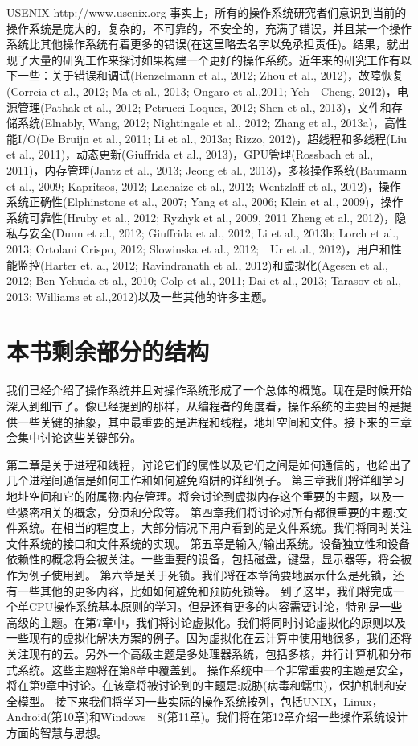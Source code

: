 	USENIX http://www.usenix.org
	事实上，所有的操作系统研究者们意识到当前的操作系统是庞大的，复杂的，不可靠的，不安全的，充满了错误，并且某一个操作系统比其他操作系统有着更多的错误(在这里略去名字以免承担责任)。结果，就出现了大量的研究工作来探讨如果构建一个更好的操作系统。近年来的研究工作有以下一些：关于错误和调试(Renzelmann et al., 2012; Zhou et
al., 2012)，故障恢复(Correia et al., 2012; Ma et al., 2013; Ongaro et al.,2011; Yeh　Cheng, 2012)，电源管理(Pathak et al., 2012; Petrucci Loques, 2012; Shen et al., 2013)，文件和存储系统(Elnably, Wang, 2012; Nightingale et al., 2012; Zhang et al., 2013a)，高性能I/O(De Bruijn et al., 2011; Li et al., 2013a; Rizzo, 2012)，超线程和多线程(Liu et al., 2011)，动态更新(Giuffrida et al., 2013)，GPU管理(Rossbach et al., 2011)，内存管理(Jantz et al., 2013;
Jeong et al., 2013)，多核操作系统(Baumann et al., 2009; Kapritsos, 2012; Lachaize et al., 2012; Wentzlaff et al., 2012)，操作系统正确性(Elphinstone et al., 2007; Yang et al., 2006; Klein et al., 2009)，操作系统可靠性(Hruby et al., 2012; Ryzhyk et al., 2009, 2011 Zheng et al., 2012)，隐私与安全(Dunn et al., 2012; Giuffrida et al., 2012; Li et al.,
2013b; Lorch et al., 2013; Ortolani Crispo, 2012; Slowinska et al., 2012;　Ur et al., 2012)，用户和性能监控(Harter et. al, 2012; Ravindranath et al., 2012)和虚拟化(Agesen et al., 2012; Ben-Yehuda et al.,
2010; Colp et al., 2011; Dai et al., 2013; Tarasov et al., 2013; Williams et al.,2012)以及一些其他的许多主题。
	
	\section{本书剩余部分的结构}
	
	我们已经介绍了操作系统并且对操作系统形成了一个总体的概览。现在是时候开始深入到细节了。像已经提到的那样，从编程者的角度看，操作系统的主要目的是提供一些关键的抽象，其中最重要的是进程和线程，地址空间和文件。接下来的三章会集中讨论这些关键部分。
	
	第二章是关于进程和线程，讨论它们的属性以及它们之间是如何通信的，也给出了几个进程间通信是如何工作和如何避免陷阱的详细例子。
	第三章我们将详细学习地址空间和它的附属物:内存管理。将会讨论到虚拟内存这个重要的主题，以及一些紧密相关的概念，分页和分段等。
	第四章我们将讨论对所有都很重要的主题:文件系统。在相当的程度上，大部分情况下用户看到的是文件系统。我们将同时关注文件系统的接口和文件系统的实现。
	第五章是输入/输出系统。设备独立性和设备依赖性的概念将会被关注。一些重要的设备，包括磁盘，键盘，显示器等，将会被作为例子使用到。
	第六章是关于死锁。我们将在本章简要地展示什么是死锁，还有一些其他的更多内容，比如如何避免和预防死锁等。
	到了这里，我们将完成一个单CPU操作系统基本原则的学习。但是还有更多的内容需要讨论，特别是一些高级的主题。在第7章中，我们将讨论虚拟化。我们将同时讨论虚拟化的原则以及一些现有的虚拟化解决方案的例子。因为虚拟化在云计算中使用地很多，我们还将关注现有的云。另外一个高级主题是多处理器系统，包括多核，并行计算机和分布式系统。这些主题将在第8章中覆盖到。
	操作系统中一个非常重要的主题是安全，将在第9章中讨论。在该章将被讨论到的主题是:威胁(病毒和蠕虫)，保护机制和安全模型。
	接下来我们将学习一些实际的操作系统按列，包括UNIX，Linux，Android(第10章)和Windows　8(第11章)。我们将在第12章介绍一些操作系统设计方面的智慧与思想。
	
